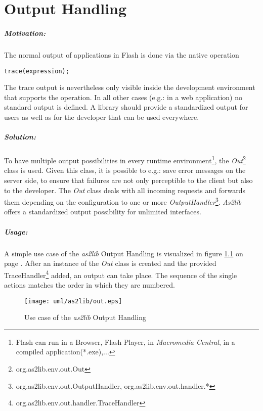 \chapter{Output Handling}
\label{sec:OutputHandling}

\paragraph{Motivation:}
The normal output of applications in Flash is done via the native operation
\begin{lstlisting}[frame=single]
trace(expression);
\end{lstlisting}
The trace output is nevertheless only visible inside the development environment that supports the operation. In all other cases (e.g.: in a web application) no standard output is defined. A library should provide a standardized output for users as well as for the developer that can be used everywhere.

\paragraph{Solution:}
To have multiple output possibilities in every runtime environment\footnote{Flash can run in a Browser, Flash Player, in {\sl Macromedia Central}, in a compiled application(*.exe),...}, the \emph{Out}\footnote{org.as2lib.env.out.Out} class is used. Given this class, it is possible to e.g.: save error messages on the server side, to ensure that failures are not only perceptible to the client but also to the developer. The \emph{Out} class deals with all incoming requests and forwards them depending on the configuration to one or more \emph{OutputHandler}\footnote{org.as2lib.env.out.OutputHandler, org.as2lib.env.out.handler.*}. {\sl As2lib} offers a standardized output possibility for unlimited interfaces.

\paragraph{Usage:}

A simple use case of the {\sl as2lib} Output Handling is visualized in figure \ref{fig:outHandling} on page \pageref{fig:outHandling}. After an instance of the \emph{Out} class is created and the provided TraceHandler\footnote{org.as2lib.env.out.handler.TraceHandler} added, an output can take place. The sequence of the single actions matches the order in which they are numbered.

\begin{figure}[!ht]
\begin{center}
\texttt{[image: uml/as2lib/out.eps]}
\caption{Use case of the {\sl as2lib} Output Handling}
\label{fig:outHandling}
\end{center}
\end{figure}


